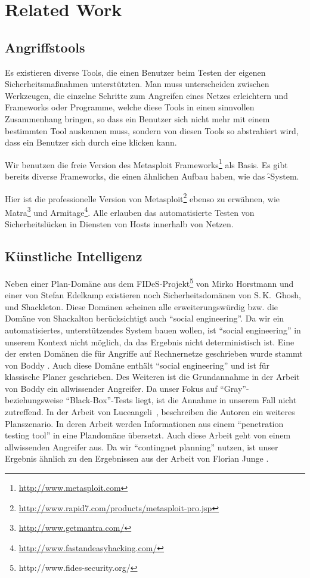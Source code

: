 \chapter{Related Work}
\label{chp:related-work}

\section{Angriffstools}
\authors{\DE}{\LM \and \MW}

Es existieren diverse Tools, die einen Benutzer beim Testen der
eigenen Sicherheitsmaßnahmen unterstützten. 
Man muss unterscheiden zwischen Werkzeugen, die einzelne Schritte zum
Angreifen eines Netzes erleichtern und Frameworks oder Programme, welche diese 
Tools in einen sinnvollen Zusammenhang bringen, so dass ein Benutzer sich 
nicht mehr mit einem bestimmten Tool auskennen muss, sondern von
diesen Tools so abstrahiert wird, dass ein Benutzer sich durch eine
 klicken kann.

Wir benutzen die freie Version des Metasploit
Frameworks\footnote{\url{http://www.metasploit.com}} als Basis. Es
gibt bereits diverse Frameworks, die einen ähnlichen Aufbau haben, wie
das \f-System. 

Hier ist die professionelle Version von
Metasploit\footnote{\url{http://www.rapid7.com/products/metasploit-pro.jsp}}
ebenso zu erwähnen, wie
Matra\footnote{\url{http://www.getmantra.com/}} und
Armitage\footnote{\url{http://www.fastandeasyhacking.com/}}. Alle
erlauben das automatisierte Testen von Sicherheitslücken in Diensten
von Hosts innerhalb von Netzen.


\section{Künstliche Intelligenz}
\authors{\DK}{\DE \and \LM \and \MW}

Neben einer Plan-Domäne aus dem FIDeS-Projekt\footnote{http://www.fides-security.org/}
von Mirko Horstmann und einer von Stefan Edelkamp existieren noch
Sicherheitsdomänen von S.\,K.~Ghosh, und Shackleton.  Diese Domänen scheinen
alle erweiterungswürdig bzw. die Domäne von Shackalton berücksichtigt auch
\enquote{social engineering}.  Da wir ein automatisiertes, unterstützendes
System bauen wollen, ist \enquote{social engineering} in unserem Kontext
nicht möglich, da das Ergebnis nicht deterministisch ist.  Eine der ersten
Domänen die für Angriffe auf Rechnernetze geschrieben wurde stammt von
Boddy \cite{BODY}.  Auch diese Domäne enthält \enquote{social engineering}
und ist für klassische Planer geschrieben.  Des Weiteren ist die
Grundannahme in der Arbeit von Boddy ein allwissender Angreifer. Da
unser Fokus auf \enquote{Gray}- beziehungsweise \enquote{Black-Box}-Tests liegt,
ist die Annahme in unserem Fall nicht zutreffend.  In der Arbeit von
Luceangeli~\cite{lucean}, beschreiben die Autoren ein weiteres
Planszenario. In deren Arbeit werden Informationen aus einem
\enquote{penetration testing tool} in eine Plandomäne übersetzt. Auch diese
Arbeit geht von einem allwissenden Angreifer aus.
Da wir \enquote{contingnet planning} nutzen, ist unser Ergebnis ähnlich zu
den Ergebnissen aus der Arbeit von Florian Junge \cite{JUNGE}.
